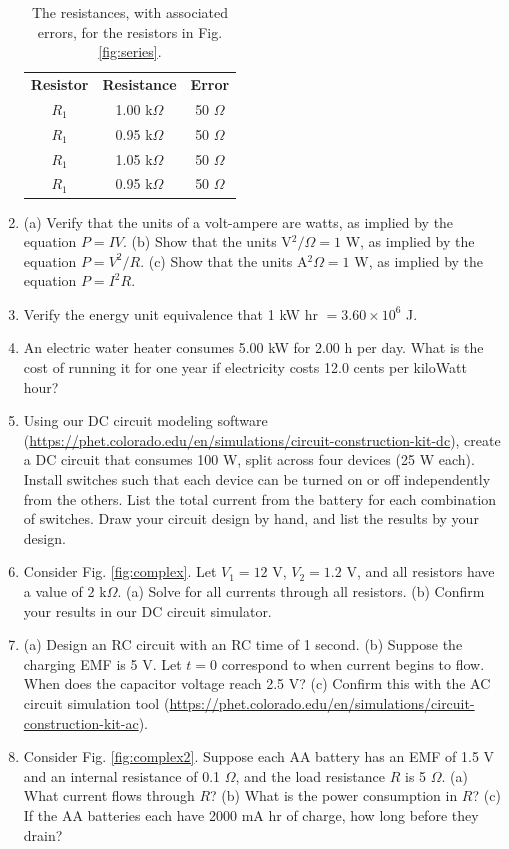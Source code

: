 \documentclass[12pt,twocolumn]{article}
\begin{document}
\begin{enumerate}
\begin{table}
\centering
\begin{tabular}{| c | c | c |}
\hline
\textbf{Resistor} & \textbf{Resistance} & \textbf{Error} \\
$R_1$ & 1.00 k$\Omega$ & 50 $\Omega$ \\
$R_1$ & 0.95 k$\Omega$ & 50 $\Omega$ \\
$R_1$ & 1.05 k$\Omega$ & 50 $\Omega$ \\
$R_1$ & 0.95 k$\Omega$ & 50 $\Omega$ \\
\hline
\end{tabular}
\caption{\label{tab:2} The resistances, with associated errors, for the resistors in Fig. \ref{fig:series}.}
\end{table}
\item (a) Verify that the units of a volt-ampere are watts, as implied by the equation $P=IV$. (b) Show that the units V$^2/\Omega=1$ W, as implied by the equation $P = V^2/R$. (c) Show that the units A$^2 \Omega=1$ W, as implied by the equation $P = I^2 R$.
\item Verify the energy unit equivalence that 1 kW hr $= 3.60\times 10^6$ J.
\item An electric water heater consumes 5.00 kW for 2.00 h per day. What is the cost of running it for one year if electricity costs 12.0 cents per kiloWatt hour?
\item Using our DC circuit modeling software (\url{https://phet.colorado.edu/en/simulations/circuit-construction-kit-dc}), create a DC circuit that consumes 100 W, split across four devices (25 W each).  Install switches such that each device can be turned on or off independently from the others.  List the total current from the battery for each combination of switches.  Draw your circuit design by hand, and list the results by your design.
\item Consider Fig. \ref{fig:complex}.  Let $V_1 = 12$ V, $V_2 = 1.2$ V, and all resistors have a value of $2$ k$\Omega$. (a) Solve for all currents through all resistors.  (b) Confirm your results in our DC circuit simulator.
\item (a) Design an RC circuit with an RC time of 1 second.  (b) Suppose the charging EMF is 5 V.  Let $t=0$ correspond to when current begins to flow.  When does the capacitor voltage reach 2.5 V? (c) Confirm this with the AC circuit simulation tool (\url{https://phet.colorado.edu/en/simulations/circuit-construction-kit-ac}).
\item Consider Fig. \ref{fig:complex2}. Suppose each AA battery has an EMF of 1.5 V and an internal resistance of 0.1 $\Omega$, and the load resistance $R$ is 5 $\Omega$.  (a) What current flows through $R$? (b) What is the power consumption in $R$? (c) If the AA batteries each have 2000 mA hr of charge, how long before they drain?
\end{enumerate}
\end{document}
